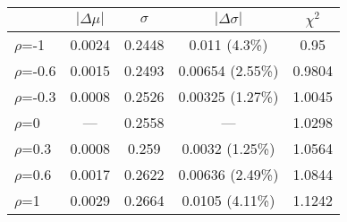 \begin{table}[!htbp]\captionsetup{justification=centering}
\begin{center}\begin{tabular}{lcccc}
\hline\hline
 & $\left|\Delta\mu\right|$ & $\sigma$ & $\left|\Delta\sigma\right|$ & $\chi^2$\\
\hline
$\rho$=-1 & 0.0024 & 0.2448 & 0.011 (4.3\%) & 0.95\\
$\rho$=-0.6 & 0.0015 & 0.2493 & 0.00654 (2.55\%) & 0.9804\\
$\rho$=-0.3 & 0.0008 & 0.2526 & 0.00325 (1.27\%) & 1.0045\\
$\rho$=0 & --- & 0.2558 & --- & 1.0298\\
$\rho$=0.3 & 0.0008 & 0.259 & 0.0032 (1.25\%) & 1.0564\\
$\rho$=0.6 & 0.0017 & 0.2622 & 0.00636 (2.49\%) & 1.0844\\
$\rho$=1 & 0.0029 & 0.2664 & 0.0105 (4.11\%) & 1.1242\\
\hline\hline
\end{tabular}
\label{tab:wjets_correlation}
\end{center}
\end{table}

